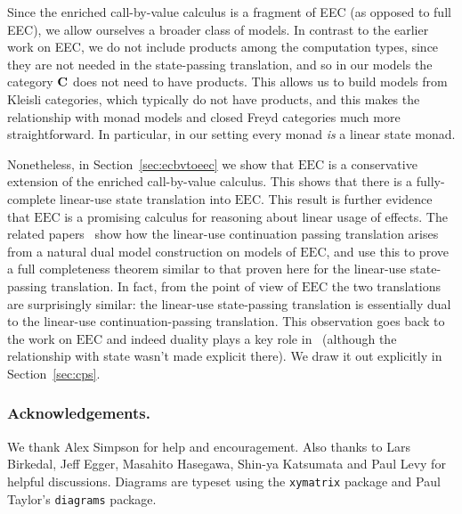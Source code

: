 \documentclass{LMCS}
\newcommand{\codefont}[1]{\mathtt{#1}}
\newcommand{\EEC}{\mathrm{EEC}}
\begin{document}
Since the enriched call-by-value calculus is a 
fragment of EEC (as opposed to full EEC), 
we allow ourselves a broader class of
models. In contrast to the earlier work on EEC, 
we do not include products among the computation types,
since they are not needed in the state-passing translation,
and so in our models the category $\mathbf{C}$ does not need to 
have products. This allows us to build models from Kleisli categories,
which typically do not have products, and this makes the relationship 
with monad models and closed Freyd categories much more straightforward.
In particular, in our setting every monad \emph{is} a linear state monad.

Nonetheless, in Section~\ref{sec:ecbvtoeec} we show that $\EEC$ is a
conservative extension of the enriched call-by-value calculus. This
shows that there is a fully-complete linear-use state translation into
$\EEC$.  This result is further evidence that $\EEC$ is a promising
calculus for reasoning about linear usage of effects. The related
papers~\cite{Mogelberg:fossacs:10,EEC:LCPS:journal} show how the linear-use
continuation passing translation arises from a natural dual model
construction on models of $\EEC$, and use this to prove a full completeness theorem 
similar to that proven here for the linear-use state-passing translation.
In fact, from the point of view of
$\EEC$ the two translations are surprisingly similar: the linear-use
state-passing translation is essentially dual to the linear-use
continuation-passing translation. This observation goes back to the work on
$\EEC$ and indeed duality plays a key role in~\cite{Mogelberg:fossacs:10} (although the relationship with state wasn't made explicit there). We draw it out explicitly in
Section~\ref{sec:cps}.


\subsubsection*{Acknowledgements.}
We thank Alex Simpson for help and encouragement. Also thanks to Lars Birkedal, Jeff Egger, Masahito Hasegawa, Shin-ya Katsumata and Paul Levy for helpful discussions. Diagrams are typeset using the \texttt{xymatrix} package
and Paul Taylor's \texttt{diagrams} package.



\newcommand{\ccat}{\mathfrak{K}}
\newcommand{\dcat}{\mathbb{D}}

\newcommand{\cbvinp}[2]{\codefont{in}_{#1}^p(#2)}
\newcommand{\cbvimagep}[1]{\codefont{image}^p(#1)}
\newcommand{\cbvcasep}[5]{\codefont{case}^p~#1~\codefont{of}~(\cbvinl{#2}.#3|\cbvinr{#4}.#5)}
\end{document}
